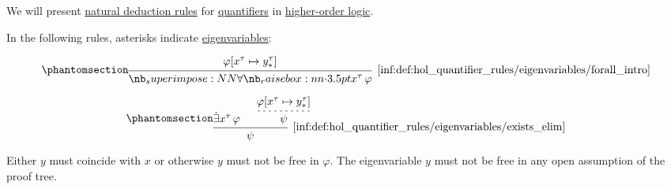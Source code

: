 \begin{definition}\label{def:hol_quantifier_rules}\mimprovised
  We will present \hyperref[def:natural_deduction_rule]{natural deduction rules} for \hyperref[def:predicate_logic_alphabet/quantifiers]{quantifiers} in \hyperref[def:higher_order_logic]{higher-order logic}.

  \begin{thmenum}
     In the following rules, asterisks indicate \hyperref[con:eigenvariable]{eigenvariables}:
    \begin{paracol}{2}
      \begin{leftcolumn}
        \ParacolAlignmentHack
        \begin{equation*}\taglabel[\ensuremath{ \forall_+ }]{inf:def:hol_quantifier_rules/eigenvariables/forall_intro}
          \begin{prooftree}
            \hypo{ \varphi[x^\tau \mapsto y_*^\tau] }
            \infer1[\ref{inf:def:hol_quantifier_rules/eigenvariables/forall_intro}]{ \qforall {x^\tau} \varphi }
          \end{prooftree}
        \end{equation*}
      \end{leftcolumn}

      \begin{rightcolumn}
        \ParacolAlignmentHack
        \begin{equation*}\taglabel[\ensuremath{ \exists_- }]{inf:def:hol_quantifier_rules/eigenvariables/exists_elim}
          \begin{prooftree}
            \hypo{ \qexists {x^\tau} \varphi }
            \hypo{ \varphi[x^\tau \mapsto y_*^\tau] }
            \infer[dashed]1{ \psi }
            \infer2[\ref{inf:def:hol_quantifier_rules/eigenvariables/exists_elim}]{ \psi }
          \end{prooftree}
        \end{equation*}
      \end{rightcolumn}
    \end{paracol}

    \begin{paracol}{2}
      \begin{leftcolumn}
        \begin{thmenum}
           Either \( y \) must coincide with \( x \) or otherwise \( y \) must not be free in \( \varphi \).
           The eigenvariable \( y \) must not be free in any open assumption of the proof tree.
        \end{thmenum}
      \end{leftcolumn}


\end{paracol}
\end{thmenum}
\end{definition}
